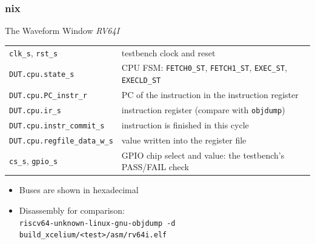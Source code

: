\documentclass{beamer}
\newcommand{\astitle}{nix}
\newcommand{\assubtitle}{nix}
\newcommand{\cmd}[1]{\texttt{#1}}
\begin{document}
\renewcommand{\assubtitle}{The Waveform Window \emph{RV64I}}
\begin{frame}
\frametitle{\astitle}
\begin{block}{\assubtitle}
  \footnotesize
  \begin{tabularx}{\linewidth}{@{}lY@{}}
    \cmd{clk\_s}, \cmd{rst\_s}                    & testbench clock and reset\\[2pt]
    \cmd{DUT.cpu.state\_s}                        & CPU FSM: \cmd{FETCH0\_ST}, \cmd{FETCH1\_ST},
                                                    \cmd{EXEC\_ST}, \cmd{EXECLD\_ST}\\[2pt]
    \cmd{DUT.cpu.PC\_instr\_r}                    & PC of the instruction in the instruction register\\[2pt]
    \cmd{DUT.cpu.ir\_s}                           & instruction register (compare with \cmd{objdump})\\[2pt]
    \cmd{DUT.cpu.instr\_commit\_s}                & instruction is finished in this cycle\\[2pt]
    \cmd{DUT.cpu.regfile\_data\_w\_s}             & value written into the register file\\[2pt]
    \cmd{cs\_s}, \cmd{gpio\_s}                    & GPIO chip select and value: the testbench's PASS/FAIL check\\
  \end{tabularx}
  \vspace{4pt}
  \begin{itemize}
    \item Buses are shown in hexadecimal
    \item Disassembly for comparison:\\
      \cmd{riscv64-unknown-linux-gnu-objdump -d build\_xcelium/<test>/asm/rv64i.elf}
  \end{itemize}
\end{block}
\end{frame}
\end{document}
